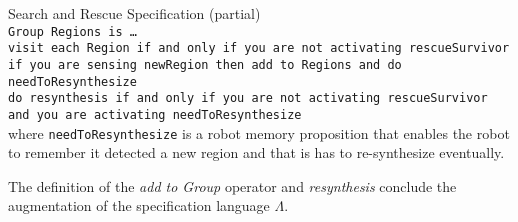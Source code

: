 \begin{myExample}\label{Ex:SnS} Search and Rescue Specification (partial)\\
	\texttt{Group Regions is \ldots}\\
	\texttt{visit each Region if and only if you are not activating rescueSurvivor}\\
	\texttt{if you are sensing newRegion then add to Regions and do needToResynthesize}\\
	\texttt{do resynthesis if and only if you are not activating rescueSurvivor and you are activating needToResynthesize}\\
	where \texttt{needToResynthesize} is a robot memory proposition that enables the robot to remember it detected a new region and that is has to re-synthesize eventually.
\end{myExample}

The definition of the \emph{add to Group} operator and \emph{resynthesis} conclude the augmentation of the specification language $\Lambda$.


%

%
%
%


